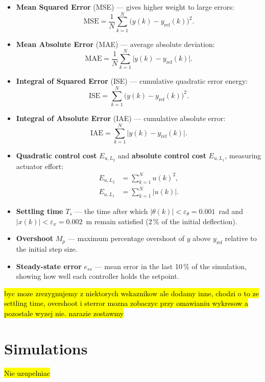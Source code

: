 \documentclass[twocolumn]{svjour3}
\begin{document}
\begin{itemize}
\item \textbf{Mean Squared Error} (MSE) --- gives higher weight to large errors:
\begin{equation}
\mathrm{MSE} = \frac{1}{N}\sum_{k=1}^{N}\bigl(y(k)-y_\mathrm{ref}(k)\bigr)^2.
\end{equation}
\item \textbf{Mean Absolute Error} (MAE) --- average absolute deviation:
\begin{equation}
\mathrm{MAE} = \frac{1}{N}\sum_{k=1}^{N}\bigl|y(k)-y_\mathrm{ref}(k)\bigr|.
\end{equation}
\item \textbf{Integral of Squared Error} (ISE) --- cumulative quadratic error energy:
\begin{equation}
\mathrm{ISE} = \sum_{k=1}^{N}\bigl(y(k)-y_\mathrm{ref}(k)\bigr)^2.
\end{equation}
\item \textbf{Integral of Absolute Error} (IAE) --- cumulative absolute error:
\begin{equation}
\mathrm{IAE} = \sum_{k=1}^{N}\bigl|y(k)-y_\mathrm{ref}(k)\bigr|.
\end{equation}
\item \textbf{Quadratic control cost} $E_{u,L_2}$ and \textbf{absolute control cost}
$E_{u,L_1}$, measuring actuator effort:
\begin{align}
E_{u,L_2} &= \sum_{k=1}^{N}u(k)^{2},\\
E_{u,L_1} &= \sum_{k=1}^{N}|u(k)|.
\end{align}
\item \textbf{Settling time} $T_s$ --- the time after which $|\theta(k)|<\varepsilon_\theta =
0.001$~rad and $|x(k)|<\varepsilon_x = 0.002$~m remain satisfied (2\,\% of the initial
deflection).
\item \textbf{Overshoot} $M_p$ --- maximum percentage overshoot of $y$ above $y_\mathrm{ref}$
relative to the initial step size.
\item \textbf{Steady-state error} $e_{ss}$ --- mean error in the last 10\,\% of the simulation,
showing how well each controller holds the setpoint.
\end{itemize}
 \hl{byc moze zrezygnujemy z niektorych wskaznikow ale dodamy inne, chodzi o to ze settling time, overshoot i sterror mozna zobaczyc przy omawianiu wykresow a pozostale wyzej nie. narazie zostawmy}
\section{Simulations}
\label{sec:s}
\hl{Nie uzupelniac}
\end{document}
